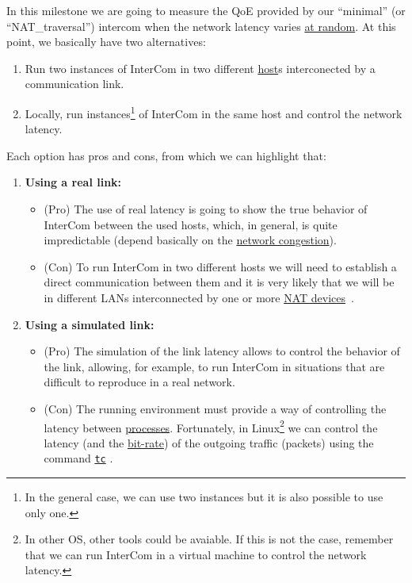 In this milestone we are going to measure the QoE provided by our
``minimal'' (or ``NAT\_traversal'') intercom when the network latency
varies \href{https://en.wikipedia.org/wiki/Randomness}{at random}. At
this point, we basically have two alternatives:
\begin{enumerate}
\item Run two instances of InterCom in two different
  \href{https://en.wikipedia.org/wiki/Host_(network)}{host}s interconected
  by a communication link.
\item Locally, run instances\footnote{In the general case, we can use
two instances but it is also possible to use only one.} of InterCom in
  the same host and control the network latency.
\end{enumerate}
Each option has pros and cons, from which we can highlight that:
\begin{enumerate}
\item \textbf{Using a real link:}
  \begin{itemize}
  \item (Pro) The use of real latency is
    going to show the true behavior of InterCom between the used hosts,
    which, in general, is quite impredictable (depend basically on the
    \href{https://en.wikipedia.org/wiki/Network_congestion}{network
      congestion}).
  \item (Con) To run InterCom in two different hosts we will need to
    establish a direct communication between them and it is very
    likely that we will be in different LANs interconnected by one or
    more
    \href{https://tecnologias-multimedia.github.io/contents/NAT_traversal/}{NAT
      devices}~\cite{srisuresh1999nat}.
  \end{itemize}
\item \textbf{Using a simulated link:}
  \begin{itemize}
  \item (Pro) The simulation of the link latency allows to control the
    behavior of the link, allowing, for example, to run InterCom in
    situations that are difficult to reproduce in a real network.
  \item (Con) The running environment must provide a way of
    controlling the latency between
    \href{https://en.wikipedia.org/wiki/Process_(computing)}{processes}. Fortunately,
    in Linux\footnote{In other OS, other tools could be avaiable. If
      this is not the case, remember that we can run InterCom in a
      virtual machine to control the network latency.} we can control
    the latency (and the
    \href{https://en.wikipedia.org/wiki/Bit_rate}{bit-rate}) of the
    outgoing traffic (packets) using the command
    \href{https://man7.org/linux/man-pages/man8/tc.8.html}{\texttt{tc}}
    \cite{bert2012lartc}.
  \end{itemize}
\end{enumerate}

